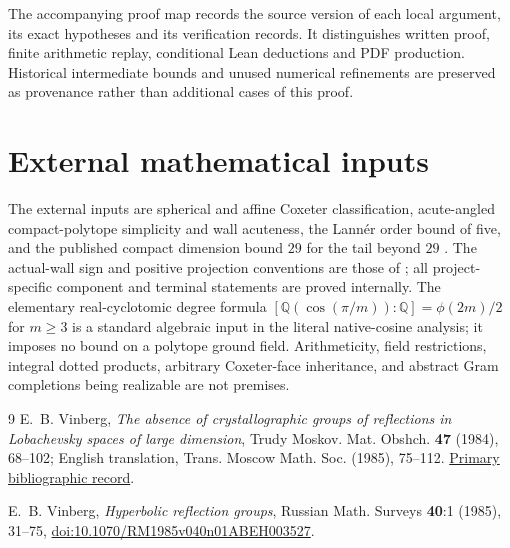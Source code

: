 \documentclass[11pt]{article}
\theoremstyle{definition}
\theoremstyle{remark}
\begin{document}
The accompanying proof map records the source version of each
local argument, its exact hypotheses and its verification records.
It distinguishes written proof, finite arithmetic replay, conditional
Lean deductions and PDF production. Historical intermediate bounds
and unused numerical refinements are preserved as provenance rather
than additional cases of this proof.

\section{External mathematical inputs}
\label{app:external}
The external inputs are spherical and affine Coxeter
classification, acute-angled compact-polytope simplicity
and wall acuteness, the Lann\'er order bound of five, and the published compact dimension
bound \(29\) for the tail beyond \(29\) \cite{Vin84,Vin85}.
The actual-wall sign and positive projection conventions are
those of \cite[p.~42, \S2.1]{Vin85}; all project-specific
component and terminal statements are proved internally.
The elementary real-cyclotomic degree formula
\([\mathbb Q(\cos(\pi/m)):\mathbb Q]=\phi(2m)/2\) for \(m\geq3\)
is a standard algebraic input in the literal native-cosine analysis; it
imposes no bound on a polytope ground field.
Arithmeticity, field restrictions, integral dotted products,
arbitrary Coxeter-face inheritance, and abstract Gram
completions being realizable are not premises.
\begin{thebibliography}{9}
E.~B. Vinberg,
\emph{The absence of crystallographic groups of reflections in
Lobachevsky spaces of large dimension},
Trudy Moskov. Mat. Obshch. \textbf{47} (1984), 68--102;
English translation, Trans. Moscow Math. Soc. (1985), 75--112.
\href{https://www.mathnet.ru/eng/mmo444}{Primary bibliographic record}.

E.~B. Vinberg,
\emph{Hyperbolic reflection groups},
Russian Math. Surveys \textbf{40}:1 (1985), 31--75,
\href{https://doi.org/10.1070/RM1985v040n01ABEH003527}
{doi:10.1070/RM1985v040n01ABEH003527}.
\end{thebibliography}
\end{document}
